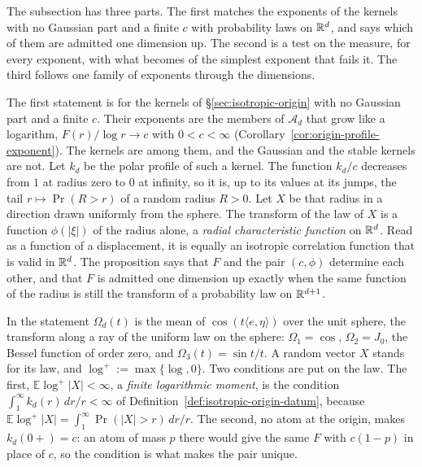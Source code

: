 The subsection has three parts. The first matches the exponents of the kernels with no
Gaussian part and a finite $c$ with probability laws on $\mathbb{R}^d$, and says which of them are
admitted one dimension up. The second is a test on the \Levy{} measure, for every exponent,
with what becomes of the simplest exponent that fails it. The third follows one family of
exponents through the dimensions.

The first statement is for the kernels of \S\ref{sec:isotropic-origin} with no Gaussian part
and a finite $c$. Their exponents are the members of $\mathcal{A}_d$ that grow like a logarithm,
$F(r)/\log r \to c$ with $0 < c < \infty$ (Corollary~\ref{cor:origin-profile-exponent}). The
\Matern{} kernels are among them, and the Gaussian and the stable kernels are not. Let $k_d$ be
the polar profile of such a kernel. The function $k_d/c$ decreases from $1$ at radius zero to
$0$ at infinity, so it is, up to its values at its jumps, the tail $r \mapsto \Pr(R > r)$ of a
random radius $R > 0$. Let $X$ be that radius in a direction drawn uniformly from the sphere.
The transform of the law of $X$ is a function $\phi(|\xi|)$ of the radius alone, a
\emph{radial characteristic function} on $\mathbb{R}^d$. Read as a function of a displacement, it is
equally an isotropic correlation function that is valid in $\mathbb{R}^d$. The proposition says that
$F$ and the pair $(c, \phi)$ determine each other, and that $F$ is admitted one dimension up
exactly when the same function of the radius is still the transform of a probability law on
$\mathbb{R}^{d+1}$.

In the statement $\Omega_d(t)$ is the mean of $\cos(t\langle e,\eta\rangle)$ over the unit
sphere, the transform along a ray of the uniform law on the sphere: $\Omega_1 = \cos$,
$\Omega_2 = J_0$, the Bessel function of order zero, and $\Omega_3(t) = \sin t/t$. A random
vector $X$ stands for its law, and $\log^+ := \max\{\log, 0\}$. Two conditions are put on the
law. The first, $\mathbb{E}\log^+|X| < \infty$, a \emph{finite logarithmic moment}, is the
condition $\int_1^\infty k_d(r)\,dr/r < \infty$ of Definition~\ref{def:isotropic-origin-datum},
because $\mathbb{E}\log^+|X| = \int_1^\infty \Pr(|X| > r)\,dr/r$. The second, no atom at the
origin, makes $k_d(0{+}) = c$: an atom of mass $p$ there would give the same $F$ with
$c(1-p)$ in place of $c$, so the condition is what makes the pair unique.

